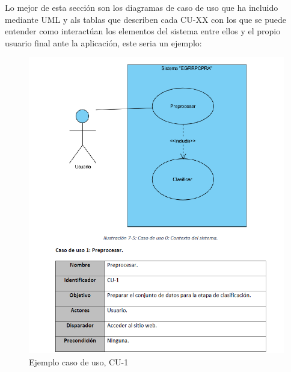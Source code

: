 Lo mejor de esta sección son los diagramas de caso de uso que ha incluido mediante UML y als tablas que describen cada CU-XX con los que se puede entender como interactúan los elementos del sistema entre ellos y el propio usuario final ante la aplicación, este seria un ejemplo:

\begin{figure}[H]
  \includegraphics[scale=0.7]{capitulos/img/img3.PNG}
  \caption{Ejemplo caso de uso, CU-1}
  \label{fig:img3}
\end{figure}

\clearpage
\hspace{15px}

